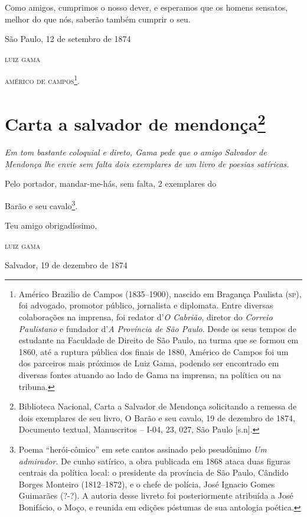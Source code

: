 Como amigos, cumprimos o nosso dever, e esperamos que os homens
sensatos, melhor do que nós, saberão também cumprir o seu.

\begin{flushright}
São Paulo, 12 de setembro de 1874

\textsc{luiz gama}
\end{flushright}

\textsc{américo de campos}\footnote{ Américo Brazilio de Campos (1835--1900),
  nascido em Bragança Paulista (\textsc{sp}), foi advogado, promotor público,
  jornalista e diplomata. Entre diversas colaborações na imprensa, foi
  redator d'\emph{O Cabrião}, diretor do \emph{Correio Paulistano} e
  fundador d'\emph{A Província de São Paulo}. Desde os seus tempos de
  estudante na Faculdade de Direito de São Paulo, na turma que se formou
  em 1860, até a ruptura pública dos finais de 1880, Américo de Campos
  foi um dos parceiros mais próximos de Luiz Gama, podendo ser
  encontrado em diversas fontes atuando ao lado de Gama na imprensa, na
  política ou na tribuna.}.

\chapter{Carta a salvador de mendonça\footnote{Biblioteca Nacional, Carta a Salvador de Mendonça
  solicitando a remessa de dois exemplares de seu livro, O Barão e seu
  cavalo, 19 de dezembro de 1874, Documento textual, Manuscritos -- I-04, 23, 027,
  São Paulo {[}s.n{]}.}} %

\begin{didascalia}
\emph{Em tom bastante coloquial e direto, Gama pede que o amigo Salvador
de Mendonça lhe envie sem falta dois exemplares de um livro de poesias
satíricas.}
\end{didascalia}

Pelo portador, mandar-me-hás, {sem falta}, 2 exemplares do

Barão e seu cavalo\footnote{ Poema ``herói-cômico'' em sete cantos
  assinado pelo pseudônimo \emph{Um admirador}. De cunho satírico, a
  obra publicada em 1868 ataca duas figuras centrais da política local:
  o presidente da província de São Paulo, Cândido Borges Monteiro
  (1812--1872), e o chefe de polícia, José Ignacio Gomes Guimarães (?-?).
  A autoria desse livreto foi posteriormente atribuída a José Bonifácio,
  o Moço, e reunida em edições póstumas de sua antologia poética.}.

\begin{flushright}
Teu amigo obrigadíssimo,

\textsc{luiz gama}

Salvador, 19 de dezembro de 1874
\end{flushright}

